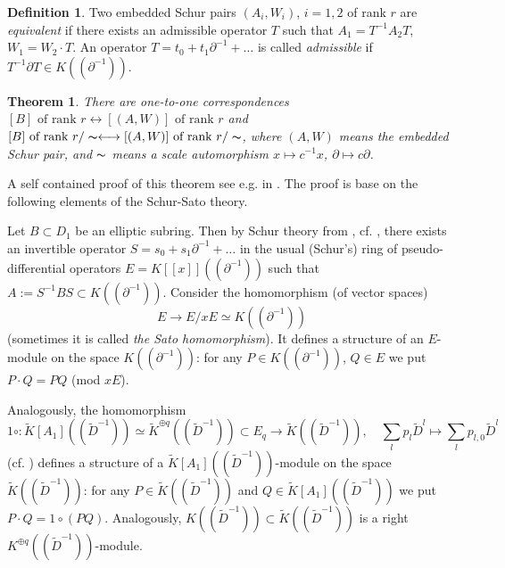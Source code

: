 \documentclass[11pt]{article}
\theoremstyle{definition}
\newtheorem{Def}{Definition}[section]
\theoremstyle{plain}
\newtheorem{theorem}{Theorem}[section]
\numberwithin{equation}{section}
\begin{document}
\begin{Def}
\label{D:equiv_Schue_pair}
Two embedded Schur pairs   $(A_i, W_i)$, $i=1,2$ of rank $r$ are {\it equivalent} if there exists an admissible operator $T$ such that $A_1=T^{-1}A_2T$, $W_1=W_2\cdot T$. An operator $T=t_0+t_1\partial^{-1}+\ldots $ is called {\it admissible} if $T^{-1}\partial T\in K((\partial^{-1}))$. 
\end{Def}

\begin{theorem}
\label{T:classif_Schur_pairs}
There are one-to-one correspondences  $\mbox{$[B]$ of rank $r$}\longleftrightarrow \mbox{$[(A,W)]$ of rank $r$}$ and $\mbox{$[B]$ of rank $r$}/\thicksim\longleftrightarrow \mbox{$[(A,W)]$ of rank $r$}/\thicksim$, where $(A,W)$ means the embedded Schur pair, and $\thicksim$ means a scale automorphism $x\mapsto c^{-1}x$, $\partial\mapsto c\partial$. 
\end{theorem}

A self contained proof of this theorem see e.g. in \cite[10.3]{Zheglov_book}. The proof is base on the following elements of the Schur-Sato theory.

Let $B\subset D_1$ be an elliptic subring. Then by Schur theory from \cite{Schur}, cf. \cite[T. 4.6, C. 4.7]{Zheglov_book}, there exists an invertible operator $S=s_0+s_1\partial^{-1} +\ldots $ in the usual (Schur's) ring of pseudo-differential operators $E=K[[x]]((\partial^{-1}))$ such that $A:=S^{-1}BS \subset K((\partial^{-1}))$. Consider the homomorphism (of vector spaces)
\begin{equation}
\label{E:Sato_hom}
E\rightarrow E/xE \simeq K((\partial^{-1}))
\end{equation}
(sometimes it is called {\it the Sato homomorphism}). It defines a structure of an $E$-module on the space  $K((\partial^{-1}))$: for any $P\in K((\partial^{-1}))$, $Q\in E$ we put  $P\cdot Q= PQ$ (mod $xE$). 

Analogously, the homomorphism 
$$
1\circ :\tilde{K}[A_1]((\tilde{D}^{-1}))\simeq \tilde{K}^{\oplus q}((\tilde{D}^{-1})) \subset E_q\rightarrow  \tilde{K}((\tilde{D}^{-1})), \quad \sum_l p_l\tilde{D}^l \mapsto  \sum_l p_{l,0}\tilde{D}^l
$$
(cf. \cite[Lem 3.3]{GZ24}) defines a structure of a $\tilde{K}[A_1]((\tilde{D}^{-1}))$-module on the space  $\tilde{K}((\tilde{D}^{-1}))$: for any $P\in \tilde{K}((\tilde{D}^{-1}))$ and $Q\in \tilde{K}[A_1]((\tilde{D}^{-1}))$ we put $P\cdot Q= 1\circ (PQ)$. Analogously, $K((\tilde{D}^{-1}))\subset \tilde{K}((\tilde{D}^{-1}))$ is a right $K^{\oplus q}((\tilde{D}^{-1}))$-module. 
\end{document}

